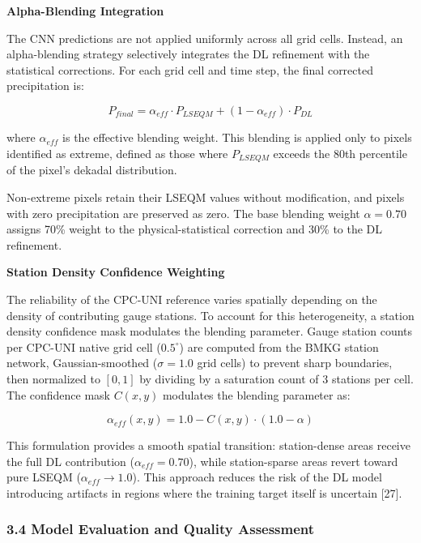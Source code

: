 \documentclass[
]{article}
\begin{document}
\textbf{Alpha-Blending Integration}

The CNN predictions are not applied uniformly across all grid cells.
Instead, an alpha-blending strategy selectively integrates the DL
refinement with the statistical corrections. For each grid cell and time
step, the final corrected precipitation is:

\[P_{final} = \alpha_{eff} \cdot P_{LSEQM} + (1 - \alpha_{eff}) \cdot P_{DL}\]

where \(\alpha_{eff}\) is the effective blending weight. This blending
is applied only to pixels identified as extreme, defined as those where
\(P_{LSEQM}\) exceeds the 80th percentile of the pixel's dekadal
distribution.

Non-extreme pixels retain their LSEQM values without modification, and
pixels with zero precipitation are preserved as zero. The base blending
weight \(\alpha = 0.70\) assigns 70\% weight to the physical-statistical
correction and 30\% to the DL refinement.

\textbf{Station Density Confidence Weighting}

The reliability of the CPC-UNI reference varies spatially depending on
the density of contributing gauge stations. To account for this
heterogeneity, a station density confidence mask modulates the blending
parameter. Gauge station counts per CPC-UNI native grid cell
(\(0.5^{\circ}\)) are computed from the BMKG station network,
Gaussian-smoothed (\(\sigma = 1.0\) grid cells) to prevent sharp
boundaries, then normalized to \([0, 1]\) by dividing by a saturation
count of 3 stations per cell. The confidence mask \(C(x, y)\) modulates
the blending parameter as:

\[\alpha_{eff}(x, y) = 1.0 - C(x, y) \cdot (1.0 - \alpha)\]

This formulation provides a smooth spatial transition: station-dense
areas receive the full DL contribution (\(\alpha_{eff} = 0.70\)), while
station-sparse areas revert toward pure LSEQM
(\(\alpha_{eff} \rightarrow 1.0\)). This approach reduces the risk of
the DL model introducing artifacts in regions where the training target
itself is uncertain {[}27{]}.

\subsubsection{3.4 Model Evaluation and Quality
Assessment}\label{model-evaluation-and-quality-assessment}
\end{document}
